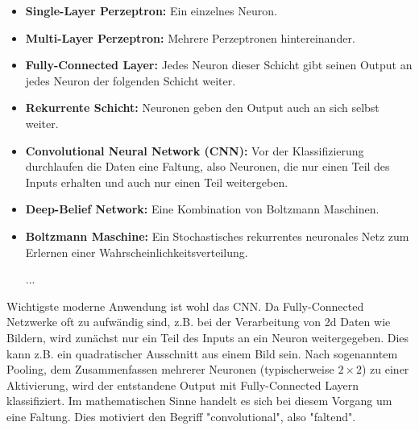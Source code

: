 		\begin{itemize}
			\item \textbf{Single-Layer Perzeptron:} Ein einzelnes Neuron.
			\item \textbf{Multi-Layer Perzeptron:} Mehrere Perzeptronen hintereinander.
			\item \textbf{Fully-Connected Layer:} Jedes Neuron dieser Schicht gibt seinen Output an jedes Neuron der folgenden Schicht weiter.
			\item \textbf{Rekurrente Schicht:} Neuronen geben den Output auch an sich selbst weiter.
			\item \textbf{Convolutional Neural Network (CNN):} Vor der Klassifizierung durchlaufen die Daten eine Faltung, also Neuronen, die nur einen Teil des Inputs erhalten und auch nur einen Teil weitergeben.
			\item \textbf{Deep-Belief Network:} Eine Kombination von Boltzmann Maschinen.
			\item \textbf{Boltzmann Maschine:} Ein Stochastisches rekurrentes neuronales Netz zum Erlernen einer Wahrscheinlichkeitsverteilung.
			
			...
		\end{itemize}
		
		Wichtigste moderne Anwendung ist wohl das CNN. Da Fully-Connected Netzwerke oft zu aufwändig sind, z.B. bei der Verarbeitung von 2d Daten wie Bildern, wird zunächst nur ein Teil des Inputs an ein Neuron weitergegeben. Dies kann z.B. ein quadratischer Ausschnitt aus einem Bild sein. Nach sogenanntem Pooling, dem Zusammenfassen mehrerer Neuronen (typischerweise $2\times 2$) zu einer Aktivierung, wird der entstandene Output mit Fully-Connected Layern klassifiziert. Im mathematischen Sinne handelt es sich bei diesem Vorgang um eine Faltung. Dies motiviert den Begriff "convolutional", also "faltend".
		
